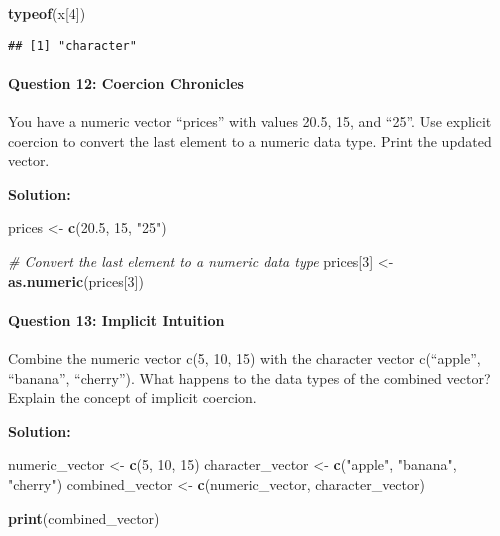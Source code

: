 \documentclass[
]{article}
\newenvironment{Shaded}{\begin{snugshade}}{\end{snugshade}}
\newcommand{\CommentTok}[1]{\textcolor[rgb]{0.56,0.35,0.01}{\textit{#1}}}
\newcommand{\DecValTok}[1]{\textcolor[rgb]{0.00,0.00,0.81}{#1}}
\newcommand{\FloatTok}[1]{\textcolor[rgb]{0.00,0.00,0.81}{#1}}
\newcommand{\FunctionTok}[1]{\textcolor[rgb]{0.13,0.29,0.53}{\textbf{#1}}}
\newcommand{\NormalTok}[1]{#1}
\newcommand{\OtherTok}[1]{\textcolor[rgb]{0.56,0.35,0.01}{#1}}
\newcommand{\StringTok}[1]{\textcolor[rgb]{0.31,0.60,0.02}{#1}}
\begin{document}
\begin{Shaded}
\begin{Highlighting}[]
\FunctionTok{typeof}\NormalTok{(x[}\DecValTok{4}\NormalTok{])}
\end{Highlighting}
\end{Shaded}

\begin{verbatim}
## [1] "character"
\end{verbatim}

\hypertarget{question-12-coercion-chronicles}{%
\paragraph{Question 12: Coercion
Chronicles}\label{question-12-coercion-chronicles}}

You have a numeric vector ``prices'' with values 20.5, 15, and ``25''.
Use explicit coercion to convert the last element to a numeric data
type. Print the updated vector.

\textbf{Solution:}

\begin{Shaded}
\begin{Highlighting}[]
\NormalTok{prices }\OtherTok{\textless{}{-}} \FunctionTok{c}\NormalTok{(}\FloatTok{20.5}\NormalTok{, }\DecValTok{15}\NormalTok{, }\StringTok{"25"}\NormalTok{)}

\CommentTok{\# Convert the last element to a numeric data type}
\NormalTok{prices[}\DecValTok{3}\NormalTok{] }\OtherTok{\textless{}{-}} \FunctionTok{as.numeric}\NormalTok{(prices[}\DecValTok{3}\NormalTok{])}
\end{Highlighting}
\end{Shaded}

\hypertarget{question-13-implicit-intuition}{%
\paragraph{Question 13: Implicit
Intuition}\label{question-13-implicit-intuition}}

Combine the numeric vector c(5, 10, 15) with the character vector
c(``apple'', ``banana'', ``cherry''). What happens to the data types of
the combined vector? Explain the concept of implicit coercion.

\textbf{Solution:}

\begin{Shaded}
\begin{Highlighting}[]
\NormalTok{numeric\_vector }\OtherTok{\textless{}{-}} \FunctionTok{c}\NormalTok{(}\DecValTok{5}\NormalTok{, }\DecValTok{10}\NormalTok{, }\DecValTok{15}\NormalTok{)}
\NormalTok{character\_vector }\OtherTok{\textless{}{-}} \FunctionTok{c}\NormalTok{(}\StringTok{"apple"}\NormalTok{, }\StringTok{"banana"}\NormalTok{, }\StringTok{"cherry"}\NormalTok{)}
\NormalTok{combined\_vector }\OtherTok{\textless{}{-}} \FunctionTok{c}\NormalTok{(numeric\_vector, character\_vector)}

\FunctionTok{print}\NormalTok{(combined\_vector)}
\end{Highlighting}
\end{Shaded}
\end{document}

